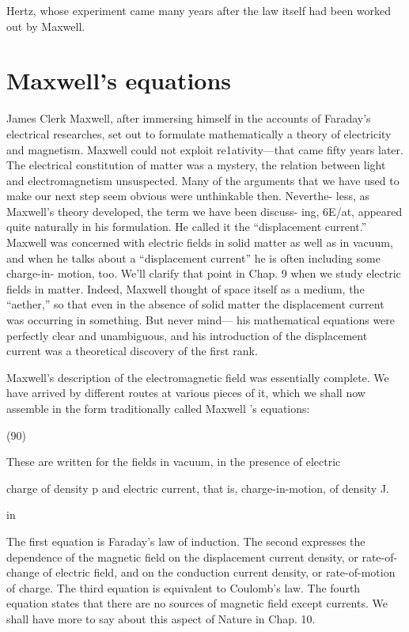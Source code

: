 Hertz, whose experiment came many years after the law itself had
been worked out by Maxwell.

\section{Maxwell's equations}

James Clerk Maxwell, after immersing himself in the accounts of
Faraday's electrical researches, set out to formulate mathematically
a theory of electricity and magnetism. Maxwell could not exploit
re1ativity---that came fifty years later. The electrical constitution
of matter was a mystery, the relation between light and electromagnetism
unsuspected. Many of the arguments that we have used to
make our next step seem obvious were unthinkable then. Neverthe-
less, as Maxwell's theory developed, the term we have been discuss-
ing, 6E/at, appeared quite naturally in his formulation. He called
it the ``displacement current.'' Maxwell was concerned with electric
fields in solid matter as well as in vacuum, and when he talks about
a ``displacement current'' he is often including some charge-in-
motion, too. We'll clarify that point in Chap. 9 when we study electric
fields in matter. Indeed, Maxwell thought of space itself as a
medium, the ``aether,'' so that even in the absence of solid matter the
displacement current was occurring in something. But never mind---
his mathematical equations were perfectly clear and unambiguous,
and his introduction of the displacement current was a theoretical
discovery of the first rank. 

Maxwell's description of the electromagnetic field was essentially
complete. We have arrived by different routes at various pieces of it,
which we shall now assemble in the form traditionally called
Maxwell 's equations:

\begin{equation}
\end{equation}
(90)

 

These are written for the fields in vacuum, in the presence of electric

charge of density p and electric current, that is, charge-in-motion,
of density J.

in

The first equation is Faraday's law of induction. The second
expresses the dependence of the magnetic field on the displacement
current density, or rate-of-change of electric field, and on the conduction
current density, or rate-of-motion of charge. The third
equation is equivalent to Coulomb's law. The fourth equation states
that there are no sources of magnetic field except currents. We shall
have more to say about this aspect of Nature in Chap. 10.

